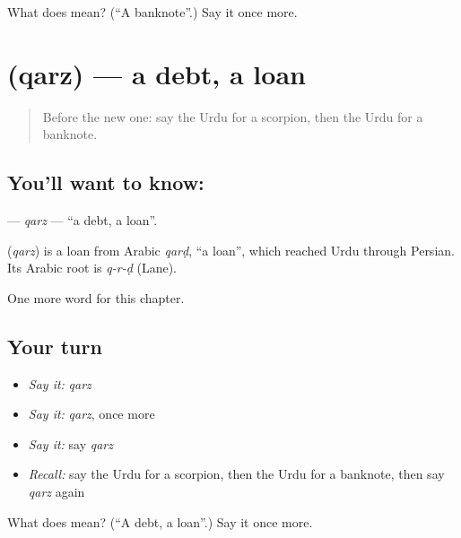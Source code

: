 \begin{tcolorbox}[breakable,colback=teal!4,colframe=teal!35!black,title={Before you move on}]
What does  mean? (\textquotedblleft{}A banknote\textquotedblright{}.) Say it once more.
\end{tcolorbox}
\section[\texorpdfstring{\ur{قرض} (qarz)}{قرض (qarz)}]{ (qarz) — a debt, a loan}

\label{lesson:UR-C209-qarz}



\begin{quote}
Before the new one: say the Urdu for a scorpion, then the Urdu for a banknote.
\end{quote}

\subsection*{You'll want to know: }
\textbf{} — \emph{qarz} — \textquotedblleft{}a debt, a loan\textquotedblright{}.

\begin{cousinweb}
\textbf{} (\emph{qarz}) is a loan from Arabic \emph{qarḍ}, \textquotedblleft{}a loan\textquotedblright{}, which reached Urdu through Persian. Its Arabic root is \emph{q-r-ḍ} (Lane).
\end{cousinweb}

\begin{grammarlens}[title={What you've built}]
One more word for this chapter.
\end{grammarlens}

\subsection*{Your turn}
\begin{itemize}
\raggedright
  \item \emph{Say it:} \emph{qarz}
  \item \emph{Say it:} \emph{qarz}, once more
  \item \emph{Say it:} say \emph{qarz}
  \item \emph{Recall:} say the Urdu for a scorpion, then the Urdu for a banknote, then say \emph{qarz} again
\end{itemize}

\begin{tcolorbox}[breakable,colback=teal!4,colframe=teal!35!black,title={Before you move on}]
What does  mean? (\textquotedblleft{}A debt, a loan\textquotedblright{}.) Say it once more.
\end{tcolorbox}
